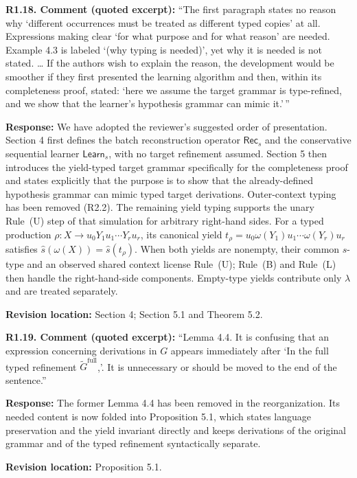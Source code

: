 \documentclass[
  10pt,
  a4paper,
]{article}
\begin{document}
\textbf{R1.18. Comment (quoted excerpt):} ``The first paragraph states no
reason why `different occurrences must be treated as different typed
copies' at all. Expressions making clear `for what purpose and for what
reason' are needed. Example 4.3 is labeled `(why typing is needed)', yet
why it is needed is not stated. \ldots{} If the authors wish to explain
the reason, the development would be smoother if they first presented
the learning algorithm and then, within its completeness proof, stated:
`here we assume the target grammar is type-refined, and we show that the
learner's hypothesis grammar can mimic it.'\,''

\textbf{Response:} We have adopted the reviewer's suggested order of
presentation. Section 4 first defines the batch reconstruction operator
\(\mathsf{Rec}_s\) and the conservative sequential learner
\(\mathsf{Learn}_s\), with no target refinement assumed. Section 5 then
introduces the yield-typed target grammar specifically for the
completeness proof and states explicitly that the purpose is to show
that the already-defined hypothesis grammar can mimic typed target
derivations. Outer-context typing has been removed (R2.2). The remaining
yield typing supports the unary Rule~\textup{(U)} step of that
simulation for arbitrary right-hand sides. For a typed production
$\rho:X\to u_0Y_1u_1\cdots Y_ru_r$, its canonical yield
$t_\rho=u_0\omega(Y_1)u_1\cdots\omega(Y_r)u_r$ satisfies
$\widehat s(\omega(X))=\widehat s(t_\rho)$.
When both yields are nonempty, their common $s$-type and an
observed shared context license Rule~\textup{(U)}; Rule~\textup{(B)}
and Rule~\textup{(L)} then handle the right-hand-side components.
Empty-type yields contribute only $\lambda$ and are treated separately.

\textbf{Revision location:} Section 4; Section 5.1 and Theorem 5.2.


\textbf{R1.19. Comment (quoted excerpt):} ``Lemma 4.4. It is confusing that an
expression concerning derivations in \(G\) appears immediately after `In
the full typed refinement \(\widetilde G^{\mathrm{full}}\),'. It is
unnecessary or should be moved to the end of the sentence.''

\textbf{Response:} The former Lemma 4.4 has been removed in the
reorganization. Its needed content is now folded into Proposition 5.1,
which states language preservation and the yield invariant directly and
keeps derivations of the original grammar and of the typed refinement
syntactically separate.

\textbf{Revision location:} Proposition 5.1.
\end{document}
